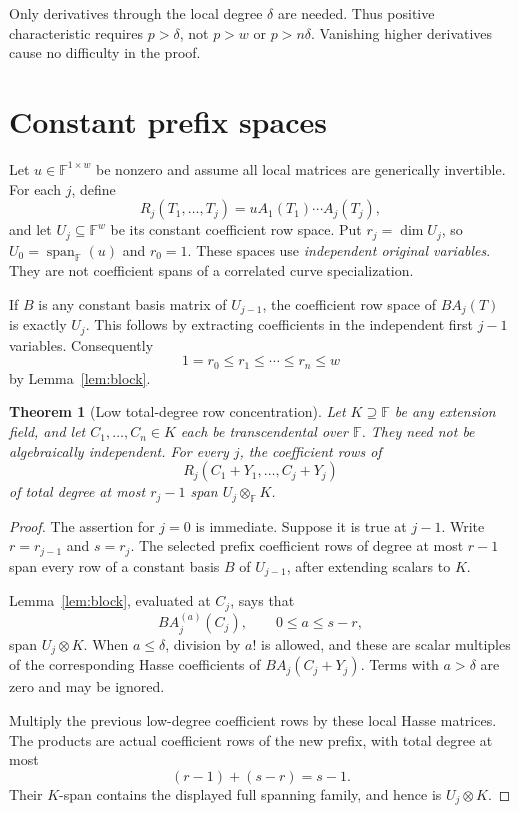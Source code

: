 \documentclass[11pt]{article}
\newtheorem{theorem}{Theorem}[section]
\newcommand{\F}{\mathbb F}
\newcommand{\Span}{\operatorname{span}}
\begin{document}
Only derivatives through the local degree \(\delta\) are needed.
Thus positive characteristic requires \(p>\delta\), not
\(p>w\) or \(p>n\delta\). Vanishing higher derivatives cause
no difficulty in the proof.

\section{Constant prefix spaces}

Let \(u\in\F^{1\times w}\) be nonzero and assume all local
matrices are generically invertible.
For each \(j\), define
\[
 R_j(T_1,\ldots,T_j)=uA_1(T_1)\cdots A_j(T_j),
\]
and let \(U_j\subseteq\F^w\) be its constant coefficient row space.
Put \(r_j=\dim U_j\), so \(U_0=\Span_\F(u)\) and \(r_0=1\).
These spaces use \emph{independent original variables}.
They are not coefficient spans of a correlated curve specialization.

If \(B\) is any constant basis matrix of \(U_{j-1}\), the coefficient
row space of \(BA_j(T)\) is exactly \(U_j\). This follows by extracting
coefficients in the independent first \(j-1\) variables.
Consequently
\[
 1=r_0\le r_1\le\cdots\le r_n\le w
\]
by Lemma~\ref{lem:block}.

\begin{theorem}[Low total-degree row concentration]\label{thm:conc}
Let \(K\supseteq\F\) be any extension field, and let
\(C_1,\ldots,C_n\in K\) each be transcendental over \(\F\).
They need not be algebraically independent.
For every \(j\), the coefficient rows of
\[
 R_j(C_1+Y_1,\ldots,C_j+Y_j)
\]
of total degree at most \(r_j-1\) span \(U_j\otimes_\F K\).
\end{theorem}
\begin{proof}
The assertion for \(j=0\) is immediate.
Suppose it is true at \(j-1\). Write \(r=r_{j-1}\) and \(s=r_j\).
The selected prefix coefficient rows of degree at most \(r-1\)
span every row of a constant basis \(B\) of \(U_{j-1}\), after
extending scalars to \(K\).

Lemma~\ref{lem:block}, evaluated at \(C_j\), says that
\[
 BA_j^{(a)}(C_j),\qquad 0\le a\le s-r,
\]
span \(U_j\otimes K\).
When \(a\le\delta\), division by \(a!\) is allowed, and
these are scalar multiples of the corresponding Hasse coefficients
of \(BA_j(C_j+Y_j)\). Terms with \(a>\delta\) are zero and may
be ignored.

Multiply the previous low-degree coefficient rows by these local
Hasse matrices. The products are actual coefficient rows of the
new prefix, with total degree at most
\[
 (r-1)+(s-r)=s-1.
\]
Their \(K\)-span contains the displayed full spanning family,
and hence is \(U_j\otimes K\).
\end{proof}
\end{document}
